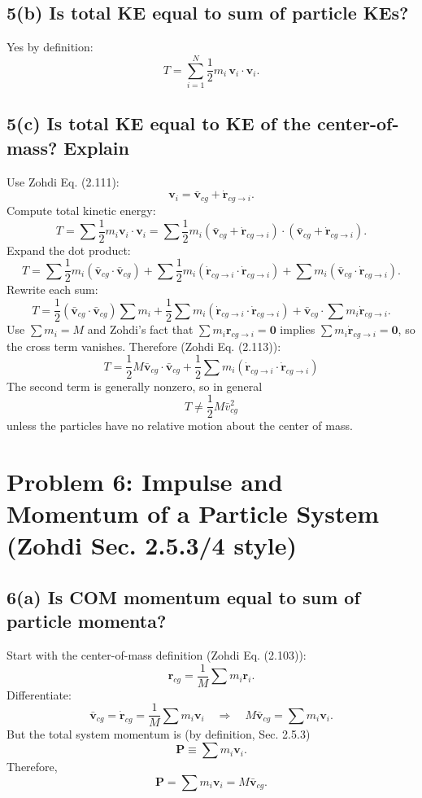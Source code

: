 \documentclass[12pt]{article}
\begin{document}
\subsection*{5(b) Is total KE equal to sum of particle KEs?}

Yes by definition:
\[
\boxed{T = \sum_{i=1}^{N}\frac12 m_i\,\bm v_i\cdot \bm v_i.}
\]

\newpage
\subsection*{5(c) Is total KE equal to KE of the center-of-mass? Explain}

Use Zohdi Eq. (2.111):
\[
\bm v_i = \bar{\bm v}_{cg} + \dot{\bm r}_{cg\to i}.
\]
Compute total kinetic energy:
\[
T = \sum \frac12 m_i \bm v_i\cdot \bm v_i
  = \sum \frac12 m_i (\bar{\bm v}_{cg} + \dot{\bm r}_{cg\to i})\cdot(\bar{\bm v}_{cg} + \dot{\bm r}_{cg\to i}).
\]
Expand the dot product:
\[
T
= \sum \frac12 m_i(\bar{\bm v}_{cg}\cdot\bar{\bm v}_{cg})
+ \sum \frac12 m_i(\dot{\bm r}_{cg\to i}\cdot\dot{\bm r}_{cg\to i})
+ \sum m_i(\bar{\bm v}_{cg}\cdot\dot{\bm r}_{cg\to i}).
\]
Rewrite each sum:
\[
T
= \frac12 (\bar{\bm v}_{cg}\cdot\bar{\bm v}_{cg})\sum m_i
+ \frac12 \sum m_i(\dot{\bm r}_{cg\to i}\cdot\dot{\bm r}_{cg\to i})
+ \bar{\bm v}_{cg}\cdot\sum m_i\dot{\bm r}_{cg\to i}.
\]
Use $\sum m_i = M$ and Zohdi’s fact that $\sum m_i \bm r_{cg\to i}=\bm 0$ implies $\sum m_i\dot{\bm r}_{cg\to i}=\bm 0$,
so the cross term vanishes. Therefore (Zohdi Eq. (2.113)):
\[
\boxed{
T = \frac12 M\bar{\bm v}_{cg}\cdot\bar{\bm v}_{cg}
  + \frac12 \sum m_i(\dot{\bm r}_{cg\to i}\cdot\dot{\bm r}_{cg\to i})
}
\]
The second term is generally nonzero, so in general
\[
\boxed{
T \neq \frac12 M\bar v_{cg}^2
}
\]
unless the particles have no relative motion about the center of mass.

\newpage
\section*{Problem 6: Impulse and Momentum of a Particle System (Zohdi Sec. 2.5.3/4 style)}

\subsection*{6(a) Is COM momentum equal to sum of particle momenta?}

Start with the center-of-mass definition (Zohdi Eq. (2.103)):
\[
\bm r_{cg} = \frac{1}{M}\sum m_i \bm r_i.
\]
Differentiate:
\[
\bar{\bm v}_{cg} = \dot{\bm r}_{cg} = \frac{1}{M}\sum m_i \bm v_i
\quad\Rightarrow\quad
M\bar{\bm v}_{cg} = \sum m_i \bm v_i.
\]
But the total system momentum is (by definition, Sec. 2.5.3)
\[
\bm P \equiv \sum m_i \bm v_i.
\]
Therefore,
\[
\boxed{\bm P = \sum m_i\bm v_i = M\bar{\bm v}_{cg}.}
\]
\end{document}
